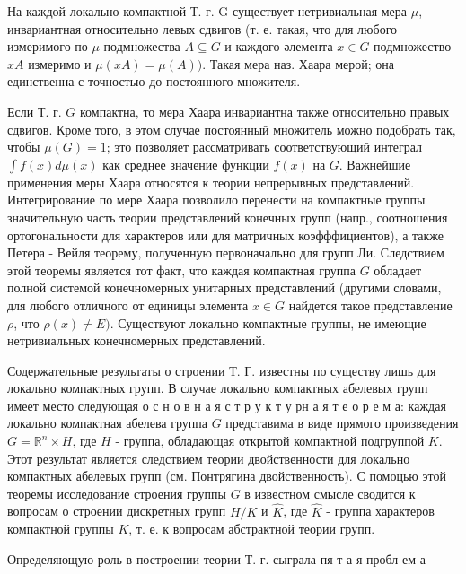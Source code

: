 \documentclass[10pt]{article}
\begin{document}
На каждой локально компактной Т. г. G существует нетривиальная мера $\mu$, инвариантная относительно левых сдвигов (т. е. такая, что для любого измеримого по $\mu$ подмножества $A \subseteq G$ и каждого әлемента $x \in G$ подмножество $x A$ измеримо и $\mu(x A)=\mu(A))$. Такая мера наз. Хаара мерой; она единственна с точностью до постоянного множителя.



Если Т. г. $G$ компактна, то мера Хаара инвариантна также относительно правых сдвигов. Кроме того, в этом случае постоянный множитель можно подобрать так, чтобы $\mu(G)=1$; это позволяет рассматривать соответствующий интеграл $\int f(x) d \mu(x)$ как среднее значение функции $f(x)$ на $G$. Важнейшие применения меры Хаара относятся к теории непрерывных представлений. Интегрирование по мере Хаара позволило перенести на компактные группы значительную часть теории представлений конечных групп (напр., соотношения ортогональности для характеров или для матричных коэфффициентов), а также Петера - Вейля теорему, полученную первоначально для групп Ли. Следствием этой теоремы является тот факт, что каждая компактная группа $G$ обладает полной системой конечномерных унитарных представлений (другими словами, для любого отличного от единицы элемента $x \in G$ найдется такое представление $\rho$, что $\rho(x) \neq E)$. Существуют локально компактные группы, не имеющие нетривиальных конечномерных представлений.



Содержательные результаты о строении Т. Г. известны по существу лишь для локально компактных групп. В случае локально компактных абелевых групп имеет место следующая о с н о в н а я с т р у к т у рн а я т е о р е м а: каждая локально компактная абелева группа $G$ представима в виде прямого произведения $G=\mathbb{R}^{n} \times H$, где $H$ - группа, обладающая открытой компактной подгруппой $K$. Этот результат является следствием теории двойственности для локально компактных абелевых групп (см. Понтрягина двойственность). С помоцью этой теоремы исследование строения группы $G$ в известном смысле сводится к вопросам о строении дискретных групп $H / K$ и $\widehat{K}$, где $\widehat{K}$ - группа характеров компактной группы $K$, т. е. к вопросам абстрактной теории групп.



Определяющую роль в построении теории Т. г. сыграла пя т а я пробл ем а
\end{document}
